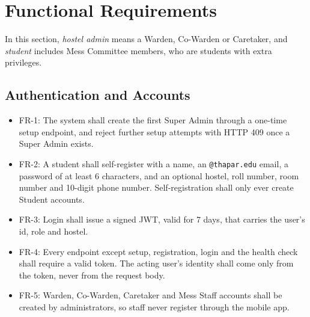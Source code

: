 \documentclass{scrreprt}
\begin{document}
\section{Functional Requirements}
In this section, \emph{hostel admin} means a Warden, Co-Warden or
Caretaker, and \emph{student} includes Mess Committee members, who are
students with extra privileges.

\subsection{Authentication and Accounts}
\begin{itemize}
    \item FR-1: The system shall create the first Super Admin through a
    one-time setup endpoint, and reject further setup attempts with HTTP 409
    once a Super Admin exists.
    \item FR-2: A student shall self-register with a name, an
    \texttt{@thapar.edu} email, a password of at least 6 characters, and an
    optional hostel, roll number, room number and 10-digit phone number.
    Self-registration shall only ever create Student accounts.
    \item FR-3: Login shall issue a signed JWT, valid for 7 days, that
    carries the user's id, role and hostel.
    \item FR-4: Every endpoint except setup, registration, login and the
    health check shall require a valid token. The acting user's identity
    shall come only from the token, never from the request body.
    \item FR-5: Warden, Co-Warden, Caretaker and Mess Staff accounts shall be
    created by administrators, so staff never register through the mobile app.
\end{itemize}
\end{document}
